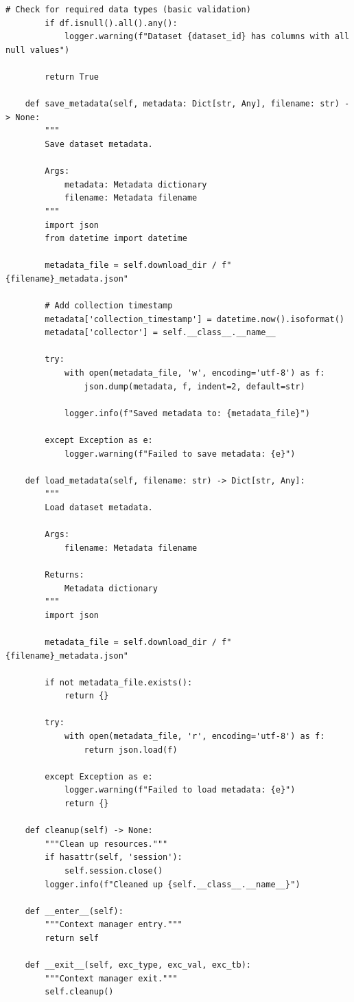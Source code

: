 \documentclass[a4paper,11pt]{article}
\begin{document}
\begin{lstlisting}[style=pythonstyle]
        # Check for required data types (basic validation)
        if df.isnull().all().any():
            logger.warning(f"Dataset {dataset_id} has columns with all null values")
        
        return True
    
    def save_metadata(self, metadata: Dict[str, Any], filename: str) -> None:
        """
        Save dataset metadata.
        
        Args:
            metadata: Metadata dictionary
            filename: Metadata filename
        """
        import json
        from datetime import datetime
        
        metadata_file = self.download_dir / f"{filename}_metadata.json"
        
        # Add collection timestamp
        metadata['collection_timestamp'] = datetime.now().isoformat()
        metadata['collector'] = self.__class__.__name__
        
        try:
            with open(metadata_file, 'w', encoding='utf-8') as f:
                json.dump(metadata, f, indent=2, default=str)
            
            logger.info(f"Saved metadata to: {metadata_file}")
            
        except Exception as e:
            logger.warning(f"Failed to save metadata: {e}")
    
    def load_metadata(self, filename: str) -> Dict[str, Any]:
        """
        Load dataset metadata.
        
        Args:
            filename: Metadata filename
            
        Returns:
            Metadata dictionary
        """
        import json
        
        metadata_file = self.download_dir / f"{filename}_metadata.json"
        
        if not metadata_file.exists():
            return {}
        
        try:
            with open(metadata_file, 'r', encoding='utf-8') as f:
                return json.load(f)
                
        except Exception as e:
            logger.warning(f"Failed to load metadata: {e}")
            return {}
    
    def cleanup(self) -> None:
        """Clean up resources."""
        if hasattr(self, 'session'):
            self.session.close()
        logger.info(f"Cleaned up {self.__class__.__name__}")
    
    def __enter__(self):
        """Context manager entry."""
        return self
    
    def __exit__(self, exc_type, exc_val, exc_tb):
        """Context manager exit."""
        self.cleanup()
\end{lstlisting}
\end{document}
